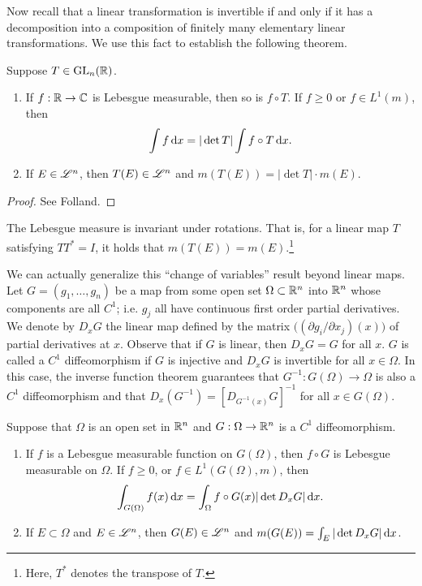 \documentclass[12pt]{article} %
\begin{document}
Now recall that a linear transformation is invertible if and only if it has a decomposition into a composition of finitely many elementary linear transformations. We use this fact to establish the following theorem.

\begin{theorem}\label{thm:2.44}
    Suppose $T \in \operatorname{GL}_n(\mathbb{R})$. \begin{enumerate}
        \item If $f : \mathbb{R} \to \mathbb{C}$ is Lebesgue measurable, then so is $f \circ T$. If $f \geq 0$ or $f \in L^1(m)$, then \begin{align*}
            \int f \, \mathrm{d} x = |\det T| \int f \circ T \, \mathrm{d} x.
        \end{align*}
        \item If $E \in \mathscr{L}^n$, then $T(E) \in \mathscr{L}^n$ and $m(T(E)) = |\det T| \cdot m(E)$.
    \end{enumerate}
\end{theorem}

\begin{proof}
    See Folland.
\end{proof}

\begin{corollary}
    The Lebesgue measure is invariant under rotations. That is, for a linear map $T$ satisfying $TT^* = I$, it holds that $m(T(E)) = m(E)$.\footnote{Here, $T^*$ denotes the transpose of $T$.}
\end{corollary}

We can actually generalize this ``change of variables'' result beyond linear maps. Let $G = (g_1, \ldots, g_n)$ be a map from some open set $\Omega \subset \mathbb{R}^n$ into $\mathbb{R}^n$ whose components are all $C^1$; i.e. $g_j$ all have continuous first order partial derivatives. We denote by $D_x G$ the linear map defined by the matrix $\Big( (\partial g_i / \partial x_j)(x) \Big)$ of partial derivatives at $x$. Observe that if $G$ is linear, then $D_x G = G$ for all $x$. $G$ is called a $C^1$ diffeomorphism if $G$ is injective and $D_x G$ is invertible for all $x \in \Omega$. In this case, the inverse function theorem guarantees that $G^{-1} : G(\Omega) \to \Omega$ is also a $C^1$ diffeomorphism and that $D_x(G^{-1}) = [D_{G^{-1}(x)}G]^{-1}$ for all $x \in G(\Omega)$.

\begin{theorem}\label{thm:2.47}
    Suppose that $\Omega$ is an open set in $\mathbb{R}^n$ and $G : \Omega \to \mathbb{R}^n$ is a $C^1$ diffeomorphism. \begin{enumerate}
        \item If $f$ is a Lebesgue measurable function on $G(\Omega)$, then $f \circ G$ is Lebesgue measurable on $\Omega$. If $f \geq 0$, or $f \in L^1(G(\Omega), m)$, then \[\int_{G(\Omega)} f(x)\, \mathrm{d} x = \int_{\Omega} f \circ G(x) |\det D_x G| \, \mathrm{d} x.\]
        \item If $E \subset \Omega$ and $E \in \mathscr{L}^n$, then $G(E) \in \mathscr{L}^n$ and $m(G(E)) = \int_E |\det D_x G| \, \mathrm{d} x$.
    \end{enumerate}
\end{theorem}
\end{document}

